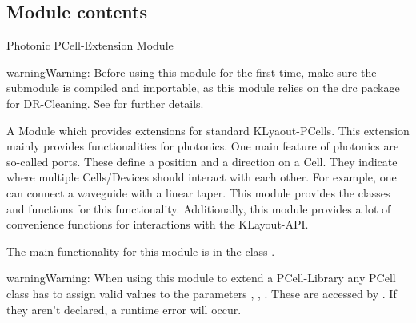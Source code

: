 \documentclass[a4paper,10pt,english]{sphinxmanual}
\begin{document}
\subsection{Module contents}
\label{\detokenize{photonics:module-kppc.photonics}}\label{\detokenize{photonics:module-contents}}
Photonic PCell-Extension Module

\begin{sphinxadmonition}{warning}{Warning:}
Before using this module for the first time, make sure the  submodule is compiled and importable, as this  module
relies on the drc package for DR-Cleaning. See  for further details.
\end{sphinxadmonition}

A Module which provides extensions for standard KLyaout-PCells. This extension mainly provides functionalities for
photonics. One main feature of photonics are so-called ports. These define a position and a direction on a Cell.
They indicate where multiple Cells/Devices should interact with each other. For example, one can connect a waveguide
with a linear taper. This module provides the classes and functions for this functionality. Additionally, this module
provides a lot of convenience functions for interactions with the KLayout-API.

The main functionality for this module is in the class {\hyperref[\detokenize{photonics:kppc.photonics.PhotDevice}]{}}.

\begin{sphinxadmonition}{warning}{Warning:}
When using this module to extend a PCell-Library any PCell class has to assign valid values to the
parameters  ,  ,  . These are accessed by {\hyperref[\detokenize{photonics:kppc.photonics.PhotDevice}]{}}. If they
aren’t declared, a runtime error will occur.
\end{sphinxadmonition}
\end{document}
